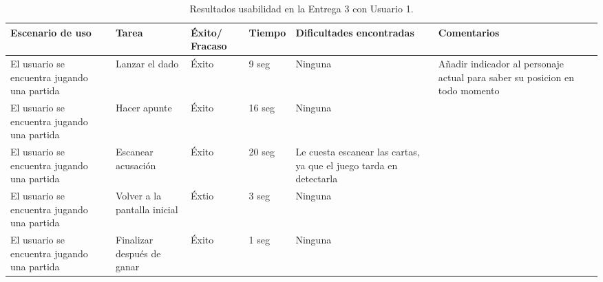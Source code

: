 \begin{table}[h]
  \begin{center}
    \begin{tabular}{|p{2.5cm}|p{1.75cm}|p{1.25cm}|p{1.25cm}|p{2.75cm}|p{3.5cm}|}

      \hline
        \rowcolor{Gray} \textbf{Escenario de uso}
        & \textbf{Tarea}
        & \textbf{Éxito/ Fracaso}
        & \textbf{Tiempo}
        & \textbf{Dificultades encontradas}
        & \textbf{Comentarios}\\

      \hline
      El usuario se encuentra jugando una partida
      & Lanzar el dado
      & Éxito
      & 9 seg
      & Ninguna
      & Añadir indicador al personaje actual para saber su posicion en todo momento\\

      \hline
      El usuario se encuentra jugando una partida
      & Hacer apunte
      & Éxito
      & 16 seg
      & Ninguna
      &\\

      \hline
      El usuario se encuentra jugando una partida
      & Escanear acusación
      & Éxito
      & 20 seg
      & Le cuesta escanear las cartas, ya que el juego tarda en detectarla
      &\\

      \hline
      El usuario se encuentra jugando una partida
      & Volver a la pantalla inicial
      & Éxtio
      & 3 seg
      & Ninguna
      &\\

      \hline
      El usuario se encuentra jugando una partida
      & Finalizar después de ganar
      & Éxito
      & 1 seg
      & Ninguna
      &\\

      \hline

    \end{tabular}

    \caption{Resultados usabilidad en la Entrega 3 con Usuario 1.}
    \label{tabla-entrega-3-usuario1}

  \end{center}
\end{table}


